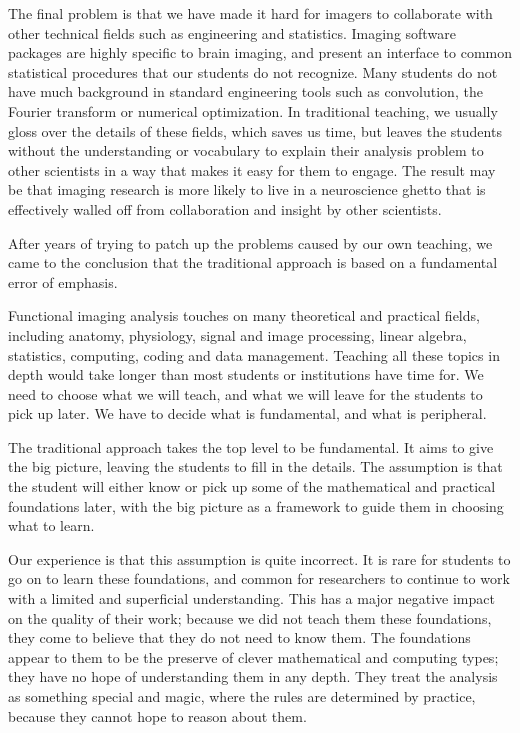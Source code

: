 The final problem is that we have made it hard for imagers to collaborate with
other technical fields such as engineering and statistics.  Imaging software
packages are highly specific to brain imaging, and present an interface to
common statistical procedures that our students do not recognize.  Many
students do not have much background in standard engineering tools such as
convolution, the Fourier transform or numerical optimization.  In traditional
teaching, we usually gloss over the details of these fields, which saves us
time, but leaves the students without the understanding or vocabulary to
explain their analysis problem to other scientists in a way that makes it easy
for them to engage.  The result may be that imaging research is more likely to
live in a neuroscience ghetto that is effectively walled off from
collaboration and insight by other scientists.

After years of trying to patch up the problems caused by our own teaching, we
came to the conclusion that the traditional approach is based on a fundamental
error of emphasis.

Functional imaging analysis touches on many theoretical and practical fields,
including anatomy, physiology, signal and image processing, linear algebra,
statistics, computing, coding and data management.  Teaching all these topics
in depth would take longer than most students or institutions have time for.
We need to choose what we will teach, and what we will leave for the students
to pick up later. We have to decide what is fundamental, and what is
peripheral.

The traditional approach takes the top level to be fundamental.  It aims to
give the big picture, leaving the students to fill in the details. The
assumption is that the student will either know or pick up some of the
mathematical and practical foundations later, with the big picture as a
framework to guide them in choosing what to learn.

Our experience is that this assumption is quite incorrect.  It is rare for
students to go on to learn these foundations, and common for researchers to
continue to work with a limited and superficial understanding.  This has a
major negative impact on the quality of their work; because we did not teach
them these foundations, they come to believe that they do not need to know
them.  The foundations appear to them to be the preserve of clever
mathematical and computing types; they have no hope of understanding them in
any depth.  They treat the analysis as something special and magic, where the
rules are determined by practice, because they cannot hope to reason about
them.

